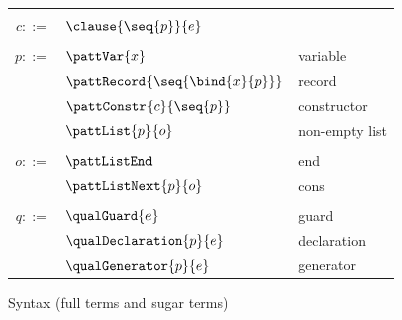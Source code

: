 \begin{figure}
{\begin{minipage}[t]{0.48\textwidth}
   \end{minipage}%
   \begin{minipage}[t]{0.5\textwidth}
      \begin{tabularx}{\textwidth}{rL{2.8cm}L{2.9cm}}
      &&
      \\
      $c ::=$
      &
      $\clause{\seq{p}}{e}$
      &
      \\
      &&
      \\[2mm]
      $p ::=$
      &
      $\pattVar{x}$
      &
      variable
      \\
      &
      $\pattRecord{\seq{\bind{x}{p}}}$
      &
      record
      \\
      &
      $\pattConstr{c}{\seq{p}}$
      &
      constructor
      \\
      &
      $\pattList{p}{o}$
      &
      non-empty list
      \\[2mm]
      &&
      \\
      $o ::=$
      &
      $\pattListEnd$
      &
      end
      \\
      &
      $\pattListNext{p}{o}$
      &
      cons
      \\[2mm]
      &&
      \\
      $q ::=$
      &
      $\qualGuard{e}$
      &
      guard
      \\
      &
      $\qualDeclaration{p}{e}$
      &
      declaration
      \\
      &
      $\qualGenerator{p}{e}$
      &
      generator
      \end{tabularx}
   \end{minipage}
   }
   \caption{Syntax (full terms and sugar terms)}
\end{figure}
